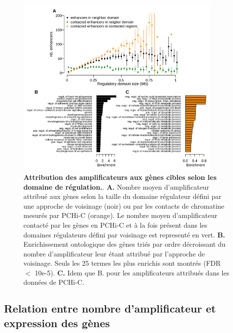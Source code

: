 \begin{figure}[H]
    \centering
    \includegraphics[width=0.9\textwidth, page=1] {figures/chap2/chap2-fig6.png}
    \caption[Attribution des amplificateurs aux gènes cibles selon les domaines de régulation.]{
    \textbf{Attribution des amplificateurs aux gènes cibles selon les domaine de régulation.}.
    \textbf{A.} Nombre moyen d'amplificateur attribué aux gènes selon la taille du domaine régulateur défini par une approche de voisinage (noir) ou par les contacts de chromatine mesurés par \gls{PCHi-C} (orange). Le nombre moyen  d'amplificateur contacté par les gènes en \gls{PCHi-C} et à la fois présent dans les domaines régulateurs défini par voisinage est representé en vert. 
    \textbf{B.} Enrichissement ontologique des gènes triés par ordre décroissant du nombre d'amplificateur leur étant attribué par l'approche de voisinage. Seuls les 25 termes les plus enrichis sont montrés (FDR $<$ 10e-5).
    \textbf{C.} Idem que B. pour les amplificateurs attribués dans les données de \gls{PCHi-C}.
    }
    \label{fig:chap2-fig6}
\end{figure}

\subsection{Relation entre nombre d’amplificateur et expression des gènes}
\label{subsec:complexite-expression}

